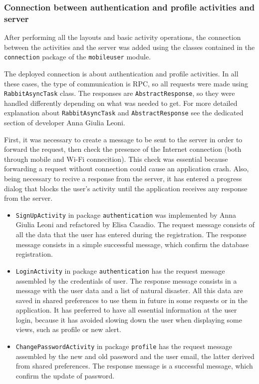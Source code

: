 \documentclass[a4paper,12pt]{report}
\begin{document}
\subsubsection{Connection between authentication and profile activities and server}
After performing all the layouts and basic activity operations, the connection between the activities and the server was added using the classes contained in the \texttt{connection} package of the \texttt{mobileuser} module.

The deployed connection is about authentication and profile activities. In all these cases, the type of communication is RPC, so all requests were made using \texttt{RabbitAsyncTask} class. The responses are \texttt{AbstractResponse}, so they were handled differently depending on what was needed to get. For more detailed explanation about \texttt{RabbitAsyncTask} and \texttt{AbstractResponse} see the dedicated section of developer Anna Giulia Leoni.

First, it was necessary to create a message to be sent to the server in order to forward the request, then check the presence of the Internet connection (both through mobile and Wi-Fi connecition). This check was essential because forwarding a request without connection could cause an application crash. Also, being necessary to recive a response from the server, it has entered a progress dialog that blocks the user's activity until the application receives any response from the server.

\begin{itemize}
\item \texttt{SignUpActivity} in package \texttt{authentication} was implemented by Anna Giulia Leoni and refactored by Elisa Casadio. The request message consists of all the data that the user has entered during the registration. The response message consists in a simple successful message, which confirm the database registration.
\item \texttt{LoginActivity} in package \texttt{authentication} has the request message assembled by the credentials of user. The response message consists in a message with the user data and a list of natural disaster. All this data are saved in shared preferences to use them in future in some requests or in the application. It has preferred to have all essential information at the user login, because it has avoided slowing down the user when displaying some views, such as profile or new alert.
\item \texttt{ChangePasswordActivity} in package \texttt{profile} has the request message assembled by the new and old password and the user email, the latter derived from shared preferences. The response message is a successful message, which confirm the update of password.
\end{itemize}
\end{document}
